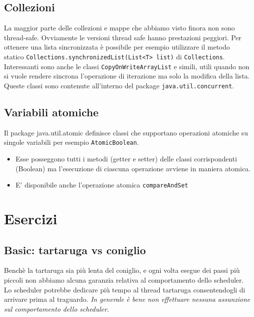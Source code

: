 \documentclass{article}
\begin{document}
\subsection{Collezioni}
La maggior parte delle collezioni e mappe che abbiamo visto finora non sono thread-safe. Ovviamente le versioni thread safe hanno prestazioni peggiori. Per ottenere una lista sincronizzata \`e possibile per esempio utilizzare il metodo statico \texttt{Collections.synchronizedList(List<T> list)} di \texttt{Collections}. Interessanti sono anche le classi \texttt{CopyOnWriteArrayList} e simili, utili quando non si vuole rendere sincrona l'operazione di iterazione ma solo la modifica della lista. Queste classi sono contenute all'interno del package \texttt{java.util.concurrent}.

\subsection{Variabili atomiche}
Il package java.util.atomic definisce classi che supportano operazioni atomiche su singole variabili per esempio \texttt{AtomicBoolean}.
\begin{itemize}
\item Esse posseggono tutti i metodi (getter e setter) delle classi corrispondenti (Boolean) ma l'esecuzione di ciascuna operazione avviene in maniera atomica.
\item E' disponibile anche l'operazione atomica \texttt{compareAndSet}
\end{itemize} 

\section{Esercizi}

\subsection{Basic: tartaruga vs coniglio}

Bench\`e la tartaruga sia pi\`u lenta del coniglio, e ogni volta esegue dei passi pi\`u piccoli non abbiamo alcuna garanzia relativa al comportamento dello scheduler. Lo scheduler potrebbe dedicare pi\`u tempo al thread tartaruga consentendogli di arrivare prima al traguardo. \emph{In generale \`e bene non effettuare nessuna assunzione sul comportamento dello scheduler.}
\end{document}

